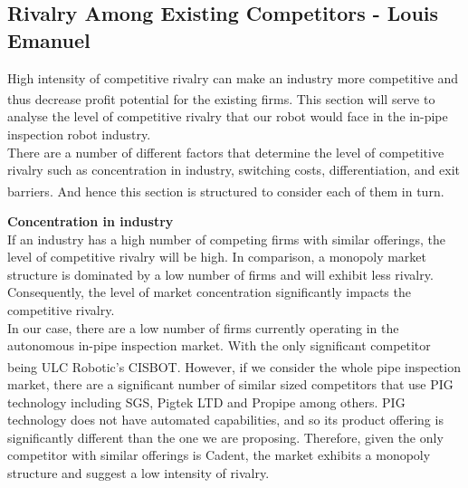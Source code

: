 \documentclass[11pt]{article}		%
\begin{document}
		\subsection[Rivalry Among Existing Competitors]{Rivalry Among Existing Competitors - Louis Emanuel}
		High intensity of competitive rivalry can make an industry more competitive and thus decrease profit potential for the existing firms\textsuperscript{\cite{porter2008five}}. This section will serve to analyse the level of competitive rivalry that our robot would face in the in-pipe inspection robot industry. \\
        \hspace*{3ex}There are a number of different factors that determine the level of competitive rivalry such as concentration in industry, switching costs, differentiation, and exit barriers\textsuperscript{\cite{rivalryfactorsCI}}. And hence this section is structured to consider each of them in turn. 
        
        \textbf{Concentration in industry}\\
        If an industry has a high number of competing firms with similar offerings, the level of competitive rivalry will be high. In comparison, a monopoly market structure is dominated by a low number of firms and will exhibit less rivalry. Consequently, the level of market concentration significantly impacts the competitive rivalry.\\
        \hspace*{3ex}In our case, there are a low number of firms currently operating in the autonomous in-pipe inspection market. With the only significant competitor being ULC Robotic’s CISBOT\textsuperscript{\cite{cisbotbeast}}. However, if we consider the whole pipe inspection market, there are a significant number of similar sized competitors that use PIG technology including SGS, Pigtek LTD and Propipe among others. PIG technology does not have automated capabilities, and so its product offering is significantly different than the one we are proposing. Therefore, given the only competitor with similar offerings is Cadent, the market exhibits a monopoly structure and suggest a low intensity of rivalry.
        
\end{document}
